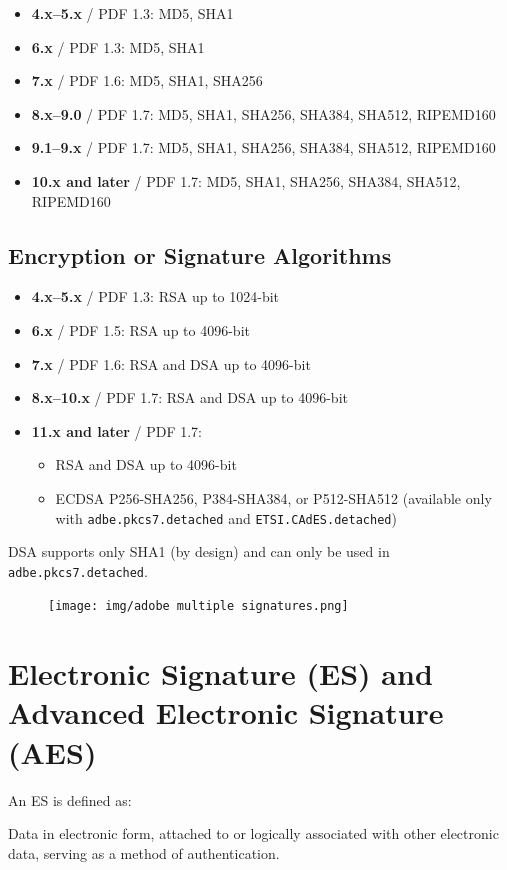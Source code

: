 \begin{itemize}
    \item \textbf{4.x–5.x} / PDF 1.3: MD5, SHA1
    \item \textbf{6.x} / PDF 1.3: MD5, SHA1
    \item \textbf{7.x} / PDF 1.6: MD5, SHA1, SHA256
    \item \textbf{8.x–9.0} / PDF 1.7: MD5, SHA1, SHA256, SHA384,
      SHA512, RIPEMD160
    \item \textbf{9.1–9.x} / PDF 1.7: MD5, SHA1, SHA256, SHA384,
      SHA512, RIPEMD160
    \item \textbf{10.x and later} / PDF 1.7: MD5, SHA1, SHA256,
      SHA384, SHA512, RIPEMD160
\end{itemize}

\subsection*{Encryption or Signature Algorithms}
\begin{itemize}
    \item \textbf{4.x–5.x} / PDF 1.3: RSA up to 1024-bit
    \item \textbf{6.x} / PDF 1.5: RSA up to 4096-bit
    \item \textbf{7.x} / PDF 1.6: RSA and DSA up to 4096-bit
    \item \textbf{8.x–10.x} / PDF 1.7: RSA and DSA up to 4096-bit
    \item \textbf{11.x and later} / PDF 1.7:
    \begin{itemize}
        \item RSA and DSA up to 4096-bit
        \item ECDSA P256-SHA256, P384-SHA384, or P512-SHA512
          (available only with \texttt{adbe.pkcs7.detached} and
          \texttt{ETSI.CAdES.detached})
    \end{itemize}
\end{itemize}

DSA supports only SHA1 (by design) and can only be used in
\texttt{adbe.pkcs7.detached}.


\begin{figure}
  \centering
  \texttt{[image: img/adobe multiple
  signatures.png]}

\end{figure}

\section{Electronic Signature (ES) and Advanced Electronic Signature
(AES)}
An ES is defined as:
\begin{boxH}
    Data in electronic form, attached to or logically associated with
    other electronic data, serving as a method of authentication.
\end{boxH}

